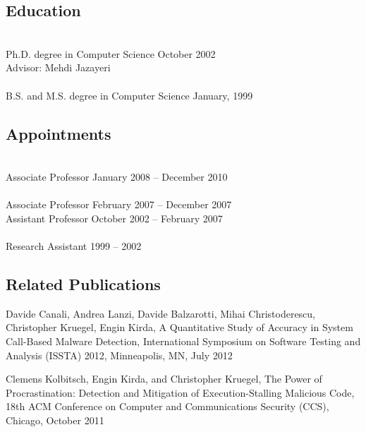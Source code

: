 \documentclass[letterpaper,twoside,11pt,headings=small]{scrartcl}
\begin{document}
\subsection*{Education}

\\
{\sc Ph.D. degree in Computer Science} \hfill October 2002\\
{\sc Advisor}: Mehdi Jazayeri\\

\\
{\sc B.S. and M.S. degree in Computer Science} \hfill January, 1999

\subsection*{Appointments}

\\
{\sc Associate Professor} \hfill January 2008 -- December 2010\\

\\
{\sc Associate Professor} \hfill February 2007 -- December 2007\\
{\sc Assistant Professor} \hfill October 2002 -- February 2007\\

\\
{\sc Research Assistant} \hfill 1999 -- 2002

\subsection*{Related Publications}

\vspace*{1em}
\noindent Davide Canali, Andrea Lanzi, Davide Balzarotti, Mihai Christoderescu,
Christopher Kruegel, Engin Kirda, A Quantitative Study of Accuracy in
System Call-Based Malware Detection, International Symposium on
Software Testing and Analysis (ISSTA) 2012, Minneapolis, MN, July 2012

\vspace*{1em}
\noindent Clemens Kolbitsch, Engin Kirda, and Christopher Kruegel, The Power of
Procrastination: Detection and Mitigation of Execution-Stalling
Malicious Code, 18th ACM Conference on Computer and Communications
Security (CCS), Chicago, October 2011
\end{document}
